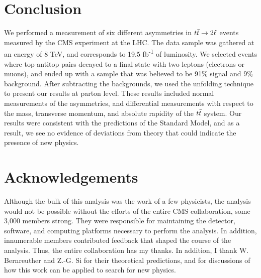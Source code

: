 \section{Conclusion}
\label{sec:afb:conclusion}

We performed a measurement of six different asymmetries in $t\bar{t} \rightarrow 2\ell$
events measured by the CMS experiment at the LHC. The data sample was
gathered at an energy of 8 TeV, and corresponds to 19.5
fb\textsuperscript{-1} of luminosity. We selected events where
top-antitop pairs decayed to a final state with two leptons (electrons
or muons), and ended up with a sample that was believed to be 91\%
signal and 9\% background. After subtracting the backgrounds, we used
the unfolding technique to present our results at parton level. These
results included normal measurements of the asymmetries, and
differential measurements with respect to the mass, transverse
momentum, and absolute rapidity of the $t\bar{t}$ system. Our results
were consistent with the predictions of the Standard Model, and as a
result, we see no evidence of deviations from theory that could
indicate the presence of new physics.

\section{Acknowledgements}
Although the bulk of this analysis was the work of a few physicists,
the analysis would not be possible without the efforts of the entire
CMS collaboration, some 3,000 members strong. They were responsible
for maintaining the detector, software, and computing platforms
necessary to perform the analysis. In addition, innumerable members
contributed feedback that shaped the course of the analysis. Thus, the
entire collaboration has my thanks. In addition, I thank
W. Bernreuther and Z.-G. Si for their theoretical predictions, and for
discussions of how this work can be applied to search for new physics.
